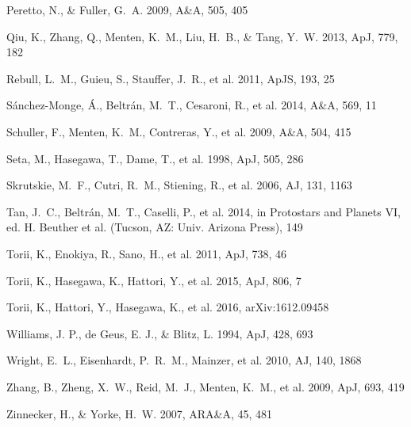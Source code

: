 \documentclass[iop]{emulateapj}
\begin{document}
\begin{thebibliography}{}
Peretto, N., \& Fuller, G.~A. 2009, A\&A, 505, 405

Qiu, K., Zhang, Q., Menten, K.~M., Liu, H.~B., \& Tang, Y.~W. 2013, ApJ, 779, 182 

Rebull, L.~M., Guieu, S., Stauffer, J.~R., et al. 2011, ApJS, 193, 25

S\'{a}nchez-Monge, \'{A}., Beltr\'{a}n, M.~T., Cesaroni, R., et al. 2014, A\&A, 569, 11

Schuller, F., Menten, K.~M., Contreras, Y., et al. 2009, A\&A, 504, 415

Seta, M., Hasegawa, T., Dame, T., et al. 1998, ApJ, 505, 286

Skrutskie, M.~F., Cutri, R.~M., Stiening, R., et al. 2006, AJ, 131, 1163

Tan, J.~C., Beltr\'an, M.~T., Caselli, P., et al. 2014, in Protostars and Planets VI, ed. H. Beuther et al. (Tucson, AZ: Univ. Arizona Press), 149

Torii, K., Enokiya, R., Sano, H., et al. 2011, ApJ, 738, 46 

Torii, K., Hasegawa, K., Hattori, Y., et al. 2015, ApJ, 806, 7 

Torii, K., Hattori, Y., Hasegawa, K., et al. 2016, arXiv:1612.09458

Williams, J. P., de Geus, E. J., \& Blitz, L. 1994, ApJ, 428, 693

Wright, E.~L., Eisenhardt, P.~R.~M., Mainzer, et al. 2010, AJ, 140, 1868

Zhang, B., Zheng, X.~W., Reid, M.~J., Menten, K.~M., et al. 2009, ApJ, 693, 419

Zinnecker, H., \& Yorke, H.~W. 2007, ARA\&A, 45, 481 

\end{thebibliography}
%
\end{document}
